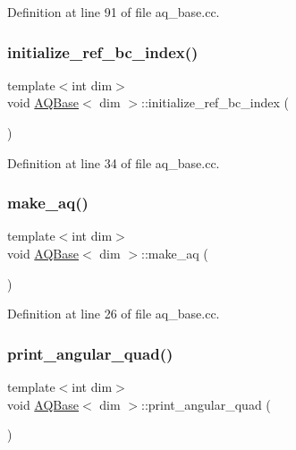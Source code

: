 Definition at line 91 of file aq\+\_\+base.\+cc.

\mbox{\label{class_a_q_base_aafde5b4c9ce19b1c6c4a8d37787f13b2}} 
\subsubsection{\texorpdfstring{initialize\+\_\+ref\+\_\+bc\+\_\+index()}{initialize\_ref\_bc\_index()}}
{\footnotesize\ttfamily template$<$int dim$>$ \\
void \hyperlink{class_a_q_base}{A\+Q\+Base}$<$ dim $>$\+::initialize\+\_\+ref\+\_\+bc\+\_\+index (\begin{DoxyParamCaption}{ }\end{DoxyParamCaption})\hspace{0.3cm}{\ttfamily [private]}}



Definition at line 34 of file aq\+\_\+base.\+cc.

\mbox{\label{class_a_q_base_ad8bf7c63bde67a2f514aea2c589983dd}} 
\subsubsection{\texorpdfstring{make\+\_\+aq()}{make\_aq()}}
{\footnotesize\ttfamily template$<$int dim$>$ \\
void \hyperlink{class_a_q_base}{A\+Q\+Base}$<$ dim $>$\+::make\+\_\+aq (\begin{DoxyParamCaption}{ }\end{DoxyParamCaption})}



Definition at line 26 of file aq\+\_\+base.\+cc.

\mbox{\label{class_a_q_base_adbe2961a0c0db888ca6a22ead08732eb}} 
\subsubsection{\texorpdfstring{print\+\_\+angular\+\_\+quad()}{print\_angular\_quad()}}
{\footnotesize\ttfamily template$<$int dim$>$ \\
void \hyperlink{class_a_q_base}{A\+Q\+Base}$<$ dim $>$\+::print\+\_\+angular\+\_\+quad (\begin{DoxyParamCaption}{ }\end{DoxyParamCaption})}



